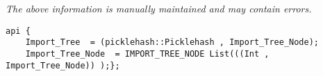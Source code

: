 \label{pkg:import\_tree}

{\tiny \it The above information is manually maintained and may contain errors.}
\begin{verbatim}
api {
    Import_Tree  = (picklehash::Picklehash , Import_Tree_Node);
    Import_Tree_Node  = IMPORT_TREE_NODE List(((Int , Import_Tree_Node)) );};
\end{verbatim}
